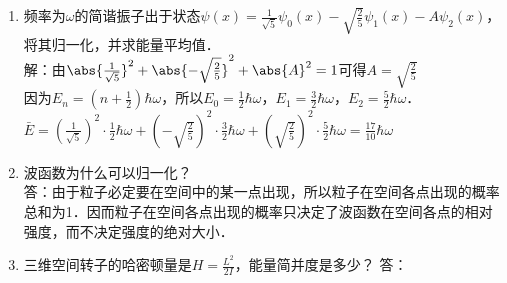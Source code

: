 
\begin{issues}
\issueDraft
\issueTODO
\end{issues}

\subsection{ }
\begin{enumerate}
\item 频率为$\omega$的简谐振子出于状态$\psi(x)=\frac{1}{\sqrt{5}}\psi_0(x)-\sqrt{\frac{2}{5}}\psi_1(x)-A\psi_2(x) $，将其归一化，并求能量平均值．\\
解：由$\abs{\frac{1}{\sqrt{5}}}^2+\abs{-\sqrt{\frac{2}{5}}}^2+\abs{A}^2=1$可得$A=\sqrt{\frac{2}{5}}$\\
因为$E_n=(n+\frac{1}{2})\hbar \omega$，所以$E_0=\frac{1}{2}\hbar\omega$，$E_1=\frac{3}{2}\hbar\omega$，$E_2=\frac{5}{2}\hbar\omega$．\\
$\bar{E}=(\frac{1}{\sqrt{5}})^2\cdot\frac{1}{2}\hbar\omega+(-\sqrt{\frac{2}{5}})^2\cdot\frac{3}{2}\hbar\omega+(\sqrt{\frac{2}{5}})^2\cdot\frac{5}{2}\hbar\omega=\frac{17}{10}\hbar\omega $
\item 波函数为什么可以归一化？\\
答：由于粒子必定要在空间中的某一点出现，所以粒子在空间各点出现的概率总和为1．因而粒子在空间各点出现的概率只决定了波函数在空间各点的相对强度，而不决定强度的绝对大小．
\item 三维空间转子的哈密顿量是$H=\frac{L^2}{2I}$，能量简并度是多少？
答：
\end{enumerate}
